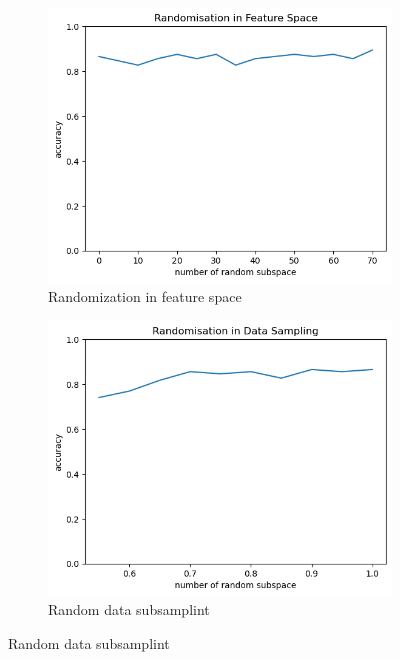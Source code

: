 \begin{figure}
	\centering
	\begin{subfigure}[t]{0.48\linewidth}
		\centering
		\includegraphics[width=\linewidth]{image/q3_fs_rs.png}
		\caption{Randomization in feature space}
		\label{fig:q3_fs}
	\end{subfigure}%
	\hfill
	\begin{subfigure}[t]{0.48\linewidth}
		\centering
		\includegraphics[width=\linewidth]{image/q3_data_rs.png}
		\caption{Random data subsamplint}
		\label{fig:q3_data}
	\end{subfigure}
	

\end{figure}
